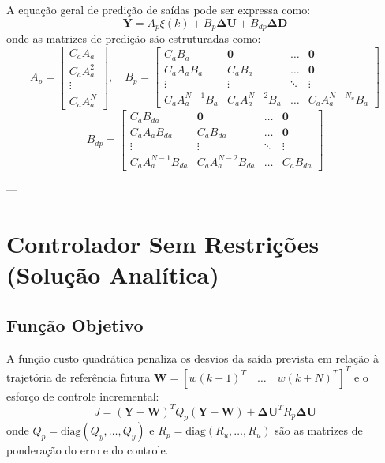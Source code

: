 \documentclass[12pt,journal,onecolumn]{article}
\begin{document}
A equação geral de predição de saídas pode ser expressa como:
\begin{equation}
\label{eq:predicao_geral}
\bm{Y} = A_p \xi(k) + B_p \bm{\Delta U} + B_{dp} \bm{\Delta D}
\end{equation}
onde as matrizes de predição são estruturadas como:
\begin{equation}
A_p = \begin{bmatrix} C_a A_a \\ C_a A_a^2 \\ \vdots \\ C_a A_a^N \end{bmatrix}, \quad
B_p = \begin{bmatrix} 
C_a B_a & \bm{0} & \dots & \bm{0} \\
C_a A_a B_a & C_a B_a & \dots & \bm{0} \\
\vdots & \vdots & \ddots & \vdots \\
C_a A_a^{N-1} B_a & C_a A_a^{N-2} B_a & \dots & C_a A_a^{N-N_u} B_a 
\end{bmatrix}
\end{equation}
\begin{equation}
B_{dp} = \begin{bmatrix} 
C_a B_{da} & \bm{0} & \dots & \bm{0} \\
C_a A_a B_{da} & C_a B_{da} & \dots & \bm{0} \\
\vdots & \vdots & \ddots & \vdots \\
C_a A_a^{N-1} B_{da} & C_a A_a^{N-2} B_{da} & \dots & C_a B_{da}
\end{bmatrix}
\end{equation}

---

\section{Controlador Sem Restrições (Solução Analítica)}

\subsection{Função Objetivo}
A função custo quadrática penaliza os desvios da saída prevista em relação à trajetória de referência futura $\bm{W} = [w(k+1)^T \quad \dots \quad w(k+N)^T]^T$ e o esforço de controle incremental:
\begin{equation}
\label{eq:custo_mpc}
J = (\bm{Y} - \bm{W})^T Q_p (\bm{Y} - \bm{W}) + \bm{\Delta U}^T R_p \bm{\Delta U}
\end{equation}
onde $Q_p = \text{diag}(Q_y, \dots, Q_y)$ e $R_p = \text{diag}(R_u, \dots, R_u)$ são as matrizes de ponderação do erro e do controle.
\end{document}
